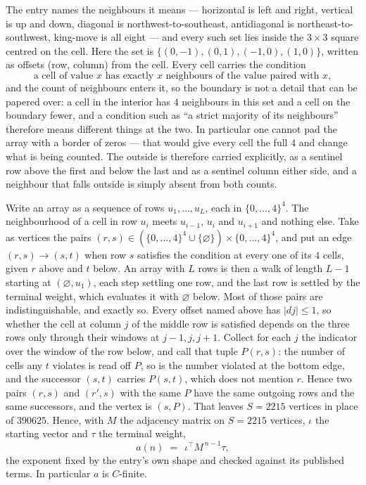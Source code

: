 \documentclass[11pt,a4paper]{article}
\theoremstyle{plain}
\theoremstyle{definition}
\begin{document}
The entry names the neighbours it means --- horizontal is left and right, vertical is up and
down, diagonal is northwest-to-southeast, antidiagonal is northeast-to-southwest, king-move is
all eight --- and every such set lies inside the $3\times3$ square centred on the cell. Here
the set is $\{(0,-1), (0,1), (-1,0), (1,0)\}$, written as offsets (row, column) from the cell. Every cell carries
the condition
\[
\text{a cell of value }x\text{ has exactly }x\text{ neighbours of the value paired with }x,
\]
and the count of neighbours enters it, so the boundary is not a detail that can be papered
over: a cell in the interior has $4$ neighbours in this set and a cell on the boundary
fewer, and a condition such as ``a strict majority of its neighbours'' therefore means
different things at the two. In particular one cannot pad the array with a border of zeros ---
that would give every cell the full $4$ and change what is being counted. The outside is
therefore carried
explicitly, as a sentinel row above the first and below the last and as a sentinel column
either side, and a neighbour that falls outside is simply absent from both counts.

Write an array as a sequence of rows $u_1,\dots,u_L$, each in
$\{0,\dots,4\}^{4}$. The neighbourhood of a cell in row $u_i$ meets $u_{i-1}$,
$u_i$ and $u_{i+1}$ and nothing else. Take as vertices the pairs
$(r,s)\in(\{0,\dots,4\}^{4}\cup\{\varnothing\})\times\{0,\dots,4\}^{4}$,
and put an edge $(r,s)\to(s,t)$ when row $s$ satisfies the condition at every one of its
$4$ cells, given $r$ above and $t$ below. An array with $L$ rows is then a walk of length
$L-1$ starting at $(\varnothing,u_1)$, each step settling one row, and the last row is
settled by the terminal weight, which evaluates it with $\varnothing$ below. Most of those pairs are indistinguishable, and exactly so. Every offset named above has $|dj|\le 1$, so whether the cell at column $j$ of the middle row is satisfied depends on the three rows only through their windows at $j-1,j,j+1$. Collect for each $j$ the indicator over the window of the row below, and call that tuple $P(r,s)$: the number of cells any $t$ violates is read off $P$, so is the number violated at the bottom edge, and the successor $(s,t)$ carries $P(s,t)$, which does not mention $r$. Hence two pairs $(r,s)$ and $(r',s)$ with the same $P$ have the same outgoing rows and the same successors, and the vertex is $(s,P)$. That leaves $S=2215$ vertices in place of $390625$. Hence,
with $M$ the adjacency matrix on $S=2215$ vertices, $\iota$ the starting vector and $\tau$ the
terminal weight,
\[
a(n)\;=\;\,\iota^{\!\top}M^{\,n-1}\tau ,
\]
the exponent fixed by the entry's own shape and checked against its published terms. In
particular $a$ is $C$-finite.
\end{document}
